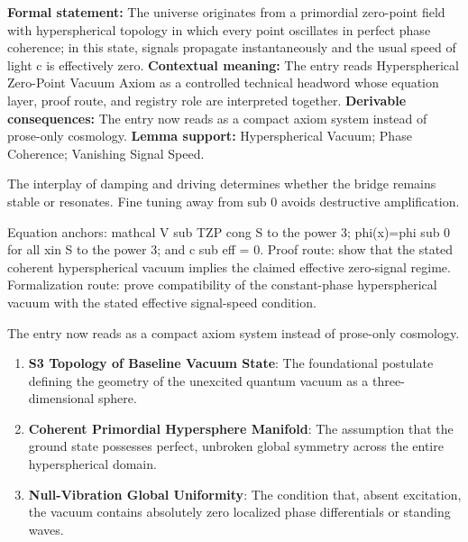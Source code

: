 \begingroup\footnotesize\setlength{\emergencystretch}{3em}\sloppy
\textbf{Formal statement:} The universe originates from a primordial zero-point field with hyperspherical topology in which every point oscillates in perfect phase coherence; in this state, signals propagate instantaneously and the usual speed of light c is effectively zero. \textbf{Contextual meaning:} The entry reads Hyperspherical Zero-Point Vacuum Axiom as a controlled technical headword whose equation layer, proof route, and registry role are interpreted together. \textbf{Derivable consequences:} The entry now reads as a compact axiom system instead of prose-only cosmology. \textbf{Lemma support:} Hyperspherical Vacuum; Phase Coherence; Vanishing Signal Speed.\par
\endgroup

The interplay of damping and driving determines whether the bridge remains stable or resonates. Fine tuning away from sub 0 avoids destructive amplification.

Equation anchors: mathcal V sub TZP cong S to the power 3; phi(x)=phi sub 0 for all xin S to the power 3; and c sub eff = 0. Proof route: show that the stated coherent hyperspherical vacuum implies the claimed effective zero-signal regime. Formalization route: prove compatibility of the constant-phase hyperspherical vacuum with the stated effective signal-speed condition.

The entry now reads as a compact axiom system instead of prose-only cosmology.
\endgroup

\begin{enumerate}[leftmargin=1.6em,itemsep=6pt,topsep=4pt]
\item \textbf{S3 Topology of Baseline Vacuum State}: The foundational postulate defining the geometry of the unexcited quantum vacuum as a three-dimensional sphere.
\item \textbf{Coherent Primordial Hypersphere Manifold}: The assumption that the ground state possesses perfect, unbroken global symmetry across the entire hyperspherical domain.
\item \textbf{Null-Vibration Global Uniformity}: The condition that, absent excitation, the vacuum contains absolutely zero localized phase differentials or standing waves.
\end{enumerate}

